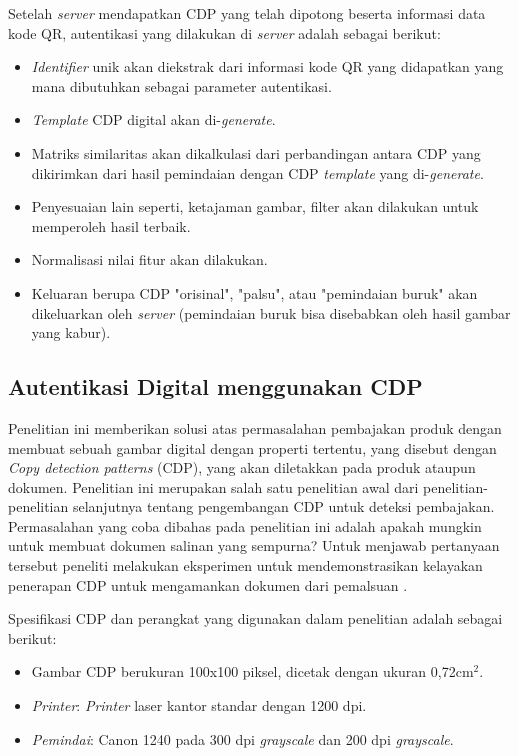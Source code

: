 \noindent Setelah \emph{server} mendapatkan CDP yang telah dipotong beserta informasi data kode QR, autentikasi yang dilakukan di \emph{server} adalah sebagai berikut:

\begin{itemize}
	\item \emph{Identifier} unik akan diekstrak dari informasi kode QR yang didapatkan yang mana dibutuhkan sebagai parameter autentikasi.
	\item \emph{Template} CDP digital akan di-\emph{generate}.
	\item Matriks similaritas akan dikalkulasi dari perbandingan antara CDP yang dikirimkan dari hasil pemindaian dengan CDP \emph{template} yang di-\emph{generate}.
	\item Penyesuaian lain seperti, ketajaman gambar, filter akan dilakukan untuk memperoleh hasil terbaik.
	\item Normalisasi nilai fitur akan dilakukan.
	\item Keluaran berupa CDP "orisinal", "palsu", atau "pemindaian buruk" akan dikeluarkan oleh \emph{server} (pemindaian buruk bisa disebabkan oleh hasil gambar yang
	      kabur).
\end{itemize}

\subsection{Autentikasi Digital menggunakan CDP}
Penelitian ini memberikan solusi atas permasalahan pembajakan produk dengan membuat sebuah gambar digital dengan properti tertentu, yang disebut dengan
\emph{Copy detection patterns} (CDP), yang akan diletakkan pada produk ataupun dokumen. Penelitian ini merupakan salah satu penelitian awal dari
penelitian-penelitian selanjutnya tentang pengembangan CDP untuk deteksi pembajakan. Permasalahan yang coba dibahas pada penelitian ini adalah apakah mungkin
untuk membuat dokumen salinan yang sempurna? Untuk menjawab pertanyaan tersebut peneliti melakukan eksperimen untuk mendemonstrasikan kelayakan penerapan CDP
untuk mengamankan dokumen dari pemalsuan \cite{picard2004digital}.

\noindent Spesifikasi CDP dan perangkat yang digunakan dalam penelitian adalah sebagai berikut:
\begin{itemize}
	\item Gambar CDP berukuran 100x100 piksel, dicetak dengan ukuran 0,72cm$^2$.
	\item \emph{Printer}: \emph{Printer} laser kantor standar dengan 1200 dpi.
	\item \emph{Pemindai}: Canon 1240 pada 300 dpi \emph{grayscale} dan 200 dpi \emph{grayscale}.
\end{itemize}

